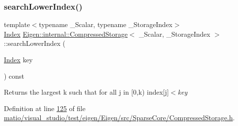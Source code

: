 \mbox{\label{class_eigen_1_1internal_1_1_compressed_storage_ad96105b5ab19886e96076513eab77da5}} 
\subsubsection{\texorpdfstring{search\+Lower\+Index()}{searchLowerIndex()}\hspace{0.1cm}{\footnotesize\ttfamily [2/4]}}
{\footnotesize\ttfamily template$<$typename \+\_\+\+Scalar, typename \+\_\+\+Storage\+Index$>$ \\
\hyperlink{namespace_eigen_a62e77e0933482dafde8fe197d9a2cfde}{Index} \hyperlink{class_eigen_1_1internal_1_1_compressed_storage}{Eigen\+::internal\+::\+Compressed\+Storage}$<$ \+\_\+\+Scalar, \+\_\+\+Storage\+Index $>$\+::search\+Lower\+Index (\begin{DoxyParamCaption}\item[{\hyperlink{namespace_eigen_a62e77e0933482dafde8fe197d9a2cfde}{Index}}]{key }\end{DoxyParamCaption}) const\hspace{0.3cm}{\ttfamily [inline]}}

\begin{DoxyReturn}{Returns}
the largest {\ttfamily k} such that for all {\ttfamily j} in \mbox{[}0,k) index\mbox{[}{\ttfamily j}\mbox{]}$<${\itshape key} 
\end{DoxyReturn}


Definition at line \hyperlink{matio_2visual__studio_2test_2eigen_2_eigen_2src_2_sparse_core_2_compressed_storage_8h_source_l00125}{125} of file \hyperlink{matio_2visual__studio_2test_2eigen_2_eigen_2src_2_sparse_core_2_compressed_storage_8h_source}{matio/visual\+\_\+studio/test/eigen/\+Eigen/src/\+Sparse\+Core/\+Compressed\+Storage.\+h}.

\mbox{\label{class_eigen_1_1internal_1_1_compressed_storage_a250b3282557fc6da7cf505f93ab5ad59}} 
